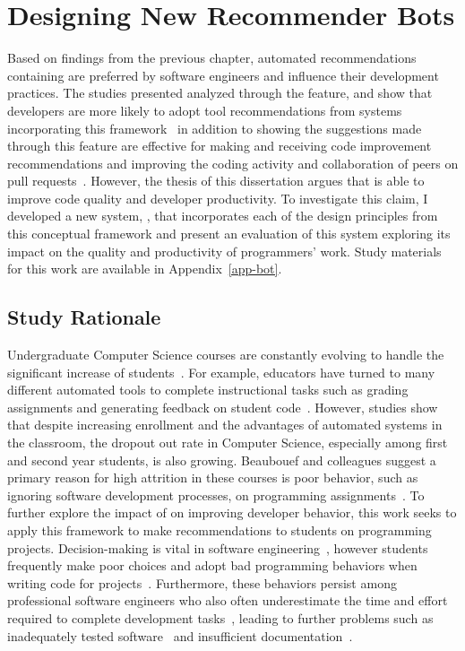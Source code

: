 \chapter{ Designing New Recommender Bots }
\label{chap-bot}

Based on findings from the previous chapter, automated recommendations containing \framework are preferred by software engineers and influence their development practices. The studies presented analyzed \framework through the \suggs feature, and show that developers are more likely to adopt tool recommendations from systems incorporating this framework~\cite{RecommendationStyles} in addition to showing the suggestions made through this feature are effective for making and receiving code improvement recommendations and improving the coding activity and collaboration of peers on pull requests~\cite{SuggUnderstanding}. However, the thesis of this dissertation argues that \framework is able to improve code quality and developer productivity. To investigate this claim, I developed a new system, \tooltwo, that incorporates each of the design principles from this conceptual framework and present an evaluation of this system exploring its impact on the quality and productivity of programmers' work. Study materials for this work are available in Appendix~\ref{app-bot}.

\section{Study Rationale}

Undergraduate Computer Science courses are constantly evolving to handle the significant increase of students~\cite{Kay98Intro}. For example, educators have turned to many different automated tools to complete instructional tasks such as grading assignments and generating feedback on student code~\cite{Wilcox2015Automation}. However, studies show that despite increasing enrollment and the advantages of automated systems in the classroom, the dropout out rate in Computer Science, especially among first and second year students, is also growing. Beaubouef and colleagues suggest a primary reason for high attrition in these courses is poor behavior, such as ignoring software development processes, on programming assignments~\cite{beaubouef2005high}. To further explore the impact of \framework on improving developer behavior, this work seeks to apply this framework to make recommendations to students on programming projects. Decision-making is vital in software engineering~\cite{WooDecision}, however students frequently make poor choices and adopt bad programming behaviors when writing code for projects~\cite{Edwards09Behaviors}. Furthermore, these behaviors persist among professional software engineers who also often underestimate the time and effort required to complete development tasks~\cite{Boehm1984SEEcon}, leading to further problems such as inadequately tested software~\cite{Whittaker00Testing} and insufficient documentation~\cite{Briand03Documentation}.

